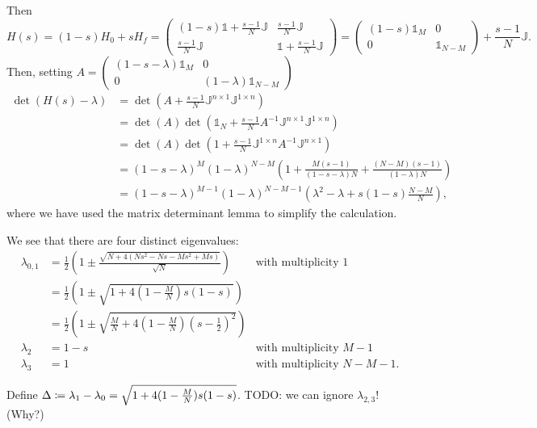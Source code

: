 Then
\[ H(s) = (1-s)H_0 + sH_f = \begin{pmatrix}
(1-s)\mathbb{1} +\frac{s-1}{N}\mathbb{J} & \frac{s-1}{N}\mathbb{J} \\
\frac{s-1}{N}\mathbb{J} & \mathbb{1} + \frac{s-1}{N}\mathbb{J}
\end{pmatrix} = \begin{pmatrix}
(1-s)\mathbb{1}_M & 0 \\ 0 & \mathbb{1}_{N-M}
\end{pmatrix} + \frac{s-1}{N}\mathbb{J}. \]
Then, setting $A = \begin{pmatrix}
(1-s-\lambda)\mathbb{1}_M & 0 \\ 0 & (1-\lambda)\mathbb{1}_{N-M}
\end{pmatrix}$
\begin{align*}
\det(H(s)-\lambda) &= \det \left(A + \frac{s-1}{N}\mathbb{J}^{n\times 1}\mathbb{J}^{1\times n}\right) \\
&= \det(A)\det \left(\mathbb{1}_N + \frac{s-1}{N}A^{-1}\mathbb{J}^{n\times 1}\mathbb{J}^{1\times n}\right) \\
&= \det(A)\det \left(1 + \frac{s-1}{N}\mathbb{J}^{1\times n}A^{-1}\mathbb{J}^{n\times 1}\right) \\
&= (1-s-\lambda)^{M}(1-\lambda)^{N-M}\left(1 + \frac{M(s-1)}{(1-s-\lambda)N} + \frac{(N-M)(s-1)}{(1-\lambda)N}\right) \\
&= (1-s-\lambda)^{M-1}(1-\lambda)^{N-M-1}\left(\lambda^2 - \lambda + s(1-s)\frac{N-M}{N}\right),
\end{align*}
where we have used the matrix determinant lemma to simplify the calculation.

We see that there are four distinct eigenvalues:
\begin{align*}
\lambda_{0,1} &= \frac{1}{2}\left(1\pm \frac{\sqrt{N+4(Ns^2-Ns-Ms^2+Ms)}}{\sqrt{N}}\right) &\text{with multiplicity $1$}\\
&= \frac{1}{2}\left(1\pm \sqrt{1+4(1- \frac{M}{N})s(1-s)}\right) \\
&= \frac{1}{2}\left(1\pm \sqrt{\frac{M}{N}+4(1- \frac{M}{N})(s-\frac{1}{2})^2}\right) \\
\lambda_{2} &= 1-s &\text{with multiplicity $M-1$}\\
\lambda_{3} &= 1 &\text{with multiplicity $N-M-1$.}
\end{align*}

Define $\Delta \coloneqq \lambda_1-\lambda_0 = \sqrt{1+4(1- \frac{M}{N})s(1-s)}$.
TODO: we can ignore $\lambda_{2,3}$! (Why?)

